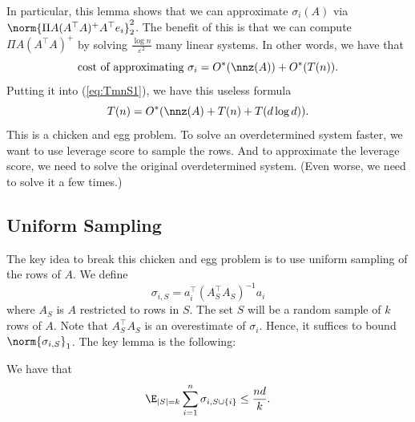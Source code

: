 In particular, this lemma shows that we can approximate $\sigma_{i}(A)$
via $\norm{\Pi A(A^{\top}A)^{+}A^{\top}e_{i}}_{2}^{2}$. The benefit
of this is that we can compute $\Pi A(A^{\top}A)^{+}$ by solving
$\frac{\log n}{\varepsilon^{2}}$ many linear systems. In other words,
we have that 
\[
\text{cost of approximating }\sigma_{i}=O^{*}(\nnz(A))+O^{*}(T(n)).
\]
Putting it into (\ref{eq:TmnS1}), we have this useless formula
\[
T(n)=O^{*}(\nnz(A)+T(n)+T(d\log d)).
\]
This is a chicken and egg problem. To solve an overdetermined system
faster, we want to use leverage score to sample the rows. And to approximate
the leverage score, we need to solve the original overdetermined system.
(Even worse, we need to solve it a few times.)

\subsection{Uniform Sampling}

The key idea to break this chicken and egg problem is to use uniform
sampling of the rows of $A$. We define
\[
\sigma_{i,S}=a_{i}^{\top}(A_{S}^{\top}A_{S})^{-1}a_{i}
\]
where $A_{S}$ is $A$ restricted to rows in $S$. The set $S$ will
be a random sample of $k$ rows of $A$. Note that $A_{S}^{\top}A_{S}$
is an overestimate of $\sigma_{i}$. Hence, it suffices to bound $\norm{\sigma_{i,S}}_{1}$.
The key lemma is the following:
\begin{lem}
\label{lem:sigmaSi}We have that
\[
\E_{|S|=k}\sum_{i=1}^{n}\sigma_{i,S\cup\{i\}}\leq\frac{nd}{k}.
\]
\end{lem}

